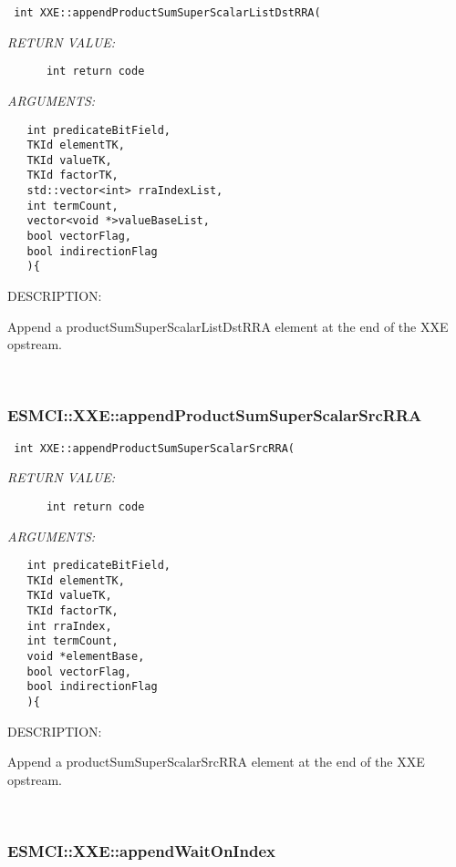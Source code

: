   
\begin{verbatim} int XXE::appendProductSumSuperScalarListDstRRA(\end{verbatim}{\em RETURN VALUE:}
\begin{verbatim}      int return code\end{verbatim}{\em ARGUMENTS:}
\begin{verbatim}   int predicateBitField,
   TKId elementTK,
   TKId valueTK,
   TKId factorTK,
   std::vector<int> rraIndexList,
   int termCount,
   vector<void *>valueBaseList,
   bool vectorFlag,
   bool indirectionFlag
   ){\end{verbatim}
{\sf DESCRIPTION:\\ }


    Append a productSumSuperScalarListDstRRA element at the end of the XXE opstream. 
 
\mbox{}\hrulefill\
 
\subsubsection [ESMCI::XXE::appendProductSumSuperScalarSrcRRA] {ESMCI::XXE::appendProductSumSuperScalarSrcRRA}


  
\begin{verbatim} int XXE::appendProductSumSuperScalarSrcRRA(\end{verbatim}{\em RETURN VALUE:}
\begin{verbatim}      int return code\end{verbatim}{\em ARGUMENTS:}
\begin{verbatim}   int predicateBitField,
   TKId elementTK,
   TKId valueTK,
   TKId factorTK,
   int rraIndex,
   int termCount,
   void *elementBase,
   bool vectorFlag,
   bool indirectionFlag
   ){\end{verbatim}
{\sf DESCRIPTION:\\ }


    Append a productSumSuperScalarSrcRRA element at the end of the XXE opstream. 
 
\mbox{}\hrulefill\
 
\subsubsection [ESMCI::XXE::appendWaitOnIndex] {ESMCI::XXE::appendWaitOnIndex}


